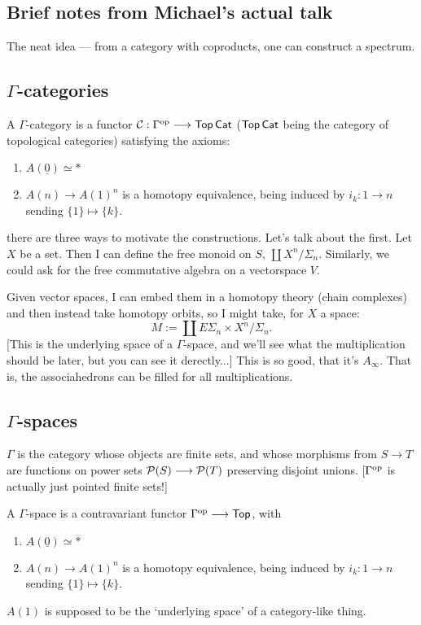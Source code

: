 \documentclass[11pt]{article}
\begin{document}
\begin{JandrGammaSpaces}

\thispagestyle{fancy}
\section*{Brief notes from Michael's actual talk}

The neat idea --- from a category with coproducts, one can construct a spectrum.


\subsection*{$\Gamma$-categories}
A $\Gamma$-category is a functor $\mathcal{C}:\Gamma^{\textup{op}}\longrightarrow\operatorname{{\mathsf{Top}}}\operatorname{{\mathsf{Cat}}}$ ($\operatorname{{\mathsf{Top}}}\operatorname{{\mathsf{Cat}}}$ being the category of topological categories) satisfying the axioms:
\begin{enumerate}\squishlist
\item $A(\underline{0})\simeq*$
\item $A(n)\to A(1)^n$ is a homotopy equivalence, being induced by $i_k:1\to n$ sending $\{1\}\mapsto\{k\}$.
\end{enumerate}




there are three ways to motivate the constructions. Let's talk about the first. Let $X$ be a set. Then I can define the free monoid on $S$, $\coprod X^n/\Sigma_n$. Similarly, we could ask for the free commutative algebra on a vectorspace $V$.

Given vector spaces, I can embed them in a homotopy theory (chain complexes) and then instead take homotopy orbits, so I might take, for $X$ a space:
\[M:=\coprod E\Sigma_n\times X^n/\Sigma_n.\]
[This is the underlying space of a $\Gamma$-space, and we'll see what the multiplication should be later, but you can see it derectly...] This is so good, that it's $A_\infty$. That is, the associahedrons can be filled for all multiplications.

\subsection*{$\Gamma$-spaces}
$\Gamma$ is the category whose objects are finite sets, and whose morphisms from $S\to T$ are functions on power sets $\mathcal{P}(S)\longrightarrow\mathcal{P}(T)$ preserving disjoint unions. [$\Gamma^{\textup{op}}$ is actually just pointed finite sets!]

A $\Gamma$-space is a contravariant functor $\Gamma^{\textup{op}}\longrightarrow\operatorname{{\mathsf{Top}}}$, with
\begin{enumerate}\squishlist
\item $A(\underline{0})\simeq*$
\item $A(n)\to A(1)^n$ is a homotopy equivalence, being induced by $i_k:1\to n$ sending $\{1\}\mapsto\{k\}$.
\end{enumerate}
$A(1)$ is supposed to be the `underlying space' of a category-like thing.


\end{JandrGammaSpaces}
\end{document}
